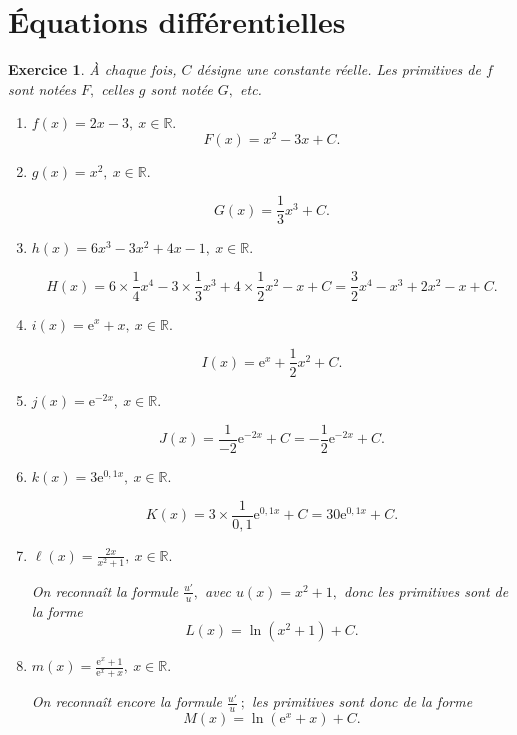 \documentclass[10pt]{article}
\newtheorem{exo}{Exercice}
\begin{document}
\section{Équations différentielles}





\begin{exo}

À chaque fois, $C$ désigne une constante réelle. Les primitives de $f$ sont notées $F,$ celles $g$ sont notée $G,$ etc.

\begin{enumerate}
\item $f(x)=2x-3,~x\in\mathbb{R}.$
\medskip \[F(x)=x^2-3x+C.\]
\item $g(x)=x^2,~x\in\mathbb{R}.$

\medskip \[G(x)=\frac{1}{3}x^3+C.\]
\item $h(x)=6x^3-3x^2+4x-1,~x\in\mathbb{R}.$

\medskip \[H(x)=6\times\frac{1}{4}x^4-3\times\frac{1}{3}x^3+4\times\frac{1}{2}x^2-x+C=\frac{3}{2}x^4-x^3+2x^2-x+C.\]

\item $i(x)=\text{e}^{x}+x,~x\in\mathbb{R}.$

\medskip \[I(x)=\text{e}^{x}+\frac{1}{2}x^2+C.\]

\item $j(x)=\text{e}^{-2x},~x\in\mathbb{R}.$

\medskip \[J(x)=\frac{1}{-2}\text{e}^{-2x}+C=-\frac{1}{2}\text{e}^{-2x}+C.\]

\item $k(x)=3\text{e}^{0,1x},~x\in\mathbb{R}.$

\medskip \[K(x)=3\times \frac{1}{0,1}\text{e}^{0,1x}+C=30\text{e}^{0,1x}+C.\]

\item $\ell(x)=\frac{2x}{x^2+1},~x\in\mathbb{R}.$
\medskip

On reconnaît la formule $\frac{u'}{u},$ avec $u(x)=x^2+1,$ donc les primitives sont de la forme \[L(x)=\ln\left(x^2+1\right)+C.\]

\item $m(x)=\frac{\text{e}^{x}+1}{\text{e}^{x}+x},~x\in\mathbb{R}.$

On reconnaît encore la formule $\frac{u'}{u}~;$ les primitives sont donc de la forme \[M(x)=\ln\left(\text{e}^{x}+x\right)+C.\]
\end{enumerate}

\end{exo}
\end{document}
